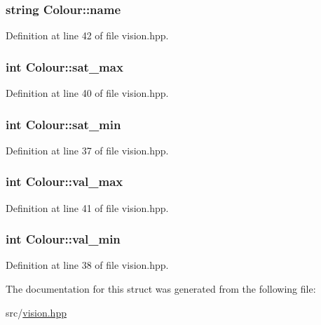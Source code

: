 \subsubsection[{\texorpdfstring{name}{name}}]{\setlength{\rightskip}{0pt plus 5cm}string Colour\+::name}\hypertarget{struct_colour_a4a7225c84050a0d8d9164643a0ccbbd2}{}\label{struct_colour_a4a7225c84050a0d8d9164643a0ccbbd2}


Definition at line 42 of file vision.\+hpp.

\subsubsection[{\texorpdfstring{sat\+\_\+max}{sat_max}}]{\setlength{\rightskip}{0pt plus 5cm}int Colour\+::sat\+\_\+max}\hypertarget{struct_colour_afe350ccf1ecf2dbf5f414ba869878d65}{}\label{struct_colour_afe350ccf1ecf2dbf5f414ba869878d65}


Definition at line 40 of file vision.\+hpp.

\subsubsection[{\texorpdfstring{sat\+\_\+min}{sat_min}}]{\setlength{\rightskip}{0pt plus 5cm}int Colour\+::sat\+\_\+min}\hypertarget{struct_colour_a060d31cb0c6cd91881d3b194878ecc9c}{}\label{struct_colour_a060d31cb0c6cd91881d3b194878ecc9c}


Definition at line 37 of file vision.\+hpp.

\subsubsection[{\texorpdfstring{val\+\_\+max}{val_max}}]{\setlength{\rightskip}{0pt plus 5cm}int Colour\+::val\+\_\+max}\hypertarget{struct_colour_abc073c89d95297937d9743f52170e853}{}\label{struct_colour_abc073c89d95297937d9743f52170e853}


Definition at line 41 of file vision.\+hpp.

\subsubsection[{\texorpdfstring{val\+\_\+min}{val_min}}]{\setlength{\rightskip}{0pt plus 5cm}int Colour\+::val\+\_\+min}\hypertarget{struct_colour_ac9491a53fac7ac1d76a3a0fb3845ac18}{}\label{struct_colour_ac9491a53fac7ac1d76a3a0fb3845ac18}


Definition at line 38 of file vision.\+hpp.



The documentation for this struct was generated from the following file\+:\begin{DoxyCompactItemize}
\item 
src/\hyperlink{vision_8hpp}{vision.\+hpp}\end{DoxyCompactItemize}
